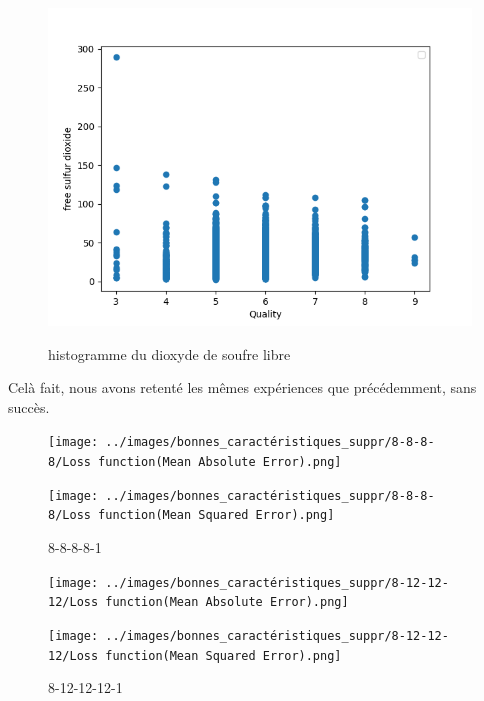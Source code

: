 \begin{figure}[!htb]
    \centering
    \begin{minipage}{0.5\textwidth}
        \includegraphics[width=01\textwidth]{../images/histo/free_sulfur_dioxide.png}
        \label{fig:histogramme du dioxyde de soufre libre}
    \end{minipage}\hfill

    \caption{histogramme du dioxyde de soufre libre}
\end{figure}

\newpage

Celà fait, nous avons retenté les mêmes expériences que précédemment, sans succès.

\vspace{1cm}

\begin{figure}[!htb]
    \begin{minipage}{0.5\textwidth}
        \centering
        \texttt{[image: ../images/bonnes\_caractéristiques\_suppr/8-8-8-8/Loss function(Mean Absolute Error).png]}
        \label{fig:8-8-8-8-1.1}
    \end{minipage}\hfill
    \begin{minipage}{0.5\textwidth}
        \centering
        \texttt{[image: ../images/bonnes\_caractéristiques\_suppr/8-8-8-8/Loss function(Mean Squared Error).png]}
        \label{fig:8-8-8-8-1.1.2}
    \end{minipage}
    \caption{8-8-8-8-1}
\end{figure}

\begin{figure}[!htb]
    \begin{minipage}{0.5\textwidth}
        \centering
        \texttt{[image: ../images/bonnes\_caractéristiques\_suppr/8-12-12-12/Loss function(Mean Absolute Error).png]}
        \label{fig:8-12-12-12-1.1}
    \end{minipage}\hfill
    \begin{minipage}{0.5\textwidth}
        \centering
        \texttt{[image: ../images/bonnes\_caractéristiques\_suppr/8-12-12-12/Loss function(Mean Squared Error).png]}
        \label{fig:8-12-12-12-1.1.2}
    \end{minipage}
    \caption{8-12-12-12-1}
\end{figure}

